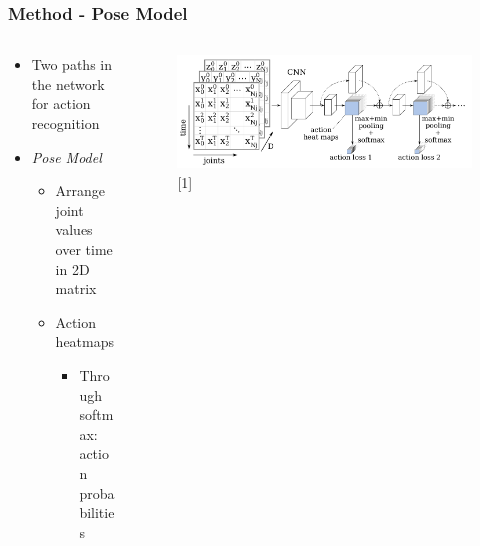 \documentclass[9pt]{beamer}
\providecommand{\sourcefix}[1]{\\ \footnotesize \tugreen{Source:} [#1]}
\newenvironment{myframe}[1][]{%
\begin{frame}%
\frametitle{#1}
\setcounter{footnote}{0}


}{%
\end{frame}%
}
\begin{document}
\begin{myframe}[Method - Pose Model]
	\begin{columns}[T]
        \begin{column}{.45\textwidth}
            \begin{itemize}
                \item Two paths in the network for action recognition
                \item \textit{Pose Model}
                \begin{itemize}
                    \item Arrange joint values over time in 2D matrix
                    \item Action heatmaps
                    \begin{itemize}
                        \item Through softmax: action probabilities
                    \end{itemize}
                \end{itemize}
            \end{itemize}
        \end{column}
        \begin{column}{.45\textwidth}
            \begin{figure}
                \includegraphics[width=.99\textwidth]{jointsovertime.png}
                \sourcefix{1}
            \end{figure}
        \end{column}
	\end{columns}
\end{myframe}
\end{document}
